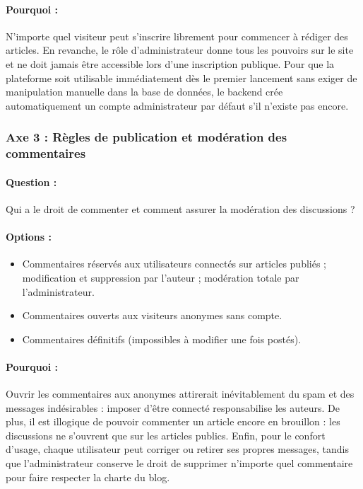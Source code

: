 \documentclass[11pt,a4paper]{article}
\begin{document}
\paragraph{Pourquoi :} N'importe quel visiteur peut s'inscrire librement pour commencer à rédiger des articles. En revanche, le rôle d'administrateur donne tous les pouvoirs sur le site et ne doit jamais être accessible lors d'une inscription publique. Pour que la plateforme soit utilisable immédiatement dès le premier lancement sans exiger de manipulation manuelle dans la base de données, le backend crée automatiquement un compte administrateur par défaut s'il n'existe pas encore.

\subsubsection{Axe 3 : Règles de publication et modération des commentaires}
\paragraph{Question :} Qui a le droit de commenter et comment assurer la modération des discussions ?
\paragraph{Options :}
\begin{itemize}
    \item[$\boxtimes$] Commentaires réservés aux utilisateurs connectés sur articles publiés ; modification et suppression par l'auteur ; modération totale par l'administrateur.
    \item[$\square$] Commentaires ouverts aux visiteurs anonymes sans compte.
    \item[$\square$] Commentaires définitifs (impossibles à modifier une fois postés).
\end{itemize}
\paragraph{Pourquoi :} Ouvrir les commentaires aux anonymes attirerait inévitablement du spam et des messages indésirables : imposer d'être connecté responsabilise les auteurs. De plus, il est illogique de pouvoir commenter un article encore en brouillon : les discussions ne s'ouvrent que sur les articles publics. Enfin, pour le confort d'usage, chaque utilisateur peut corriger ou retirer ses propres messages, tandis que l'administrateur conserve le droit de supprimer n'importe quel commentaire pour faire respecter la charte du blog.
\end{document}
